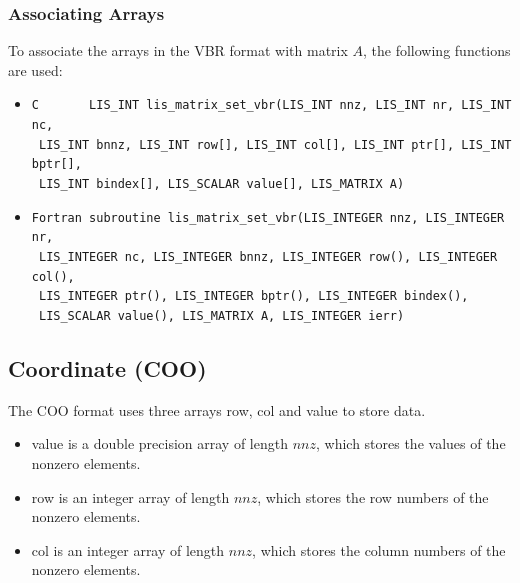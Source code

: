 \documentclass[a4paper]{article}
\begin{document}
\subsubsection{Associating Arrays}
To associate the arrays in the VBR format with matrix $A$, the following functions are used:
\begin{itemize}
\item \verb|C       LIS_INT lis_matrix_set_vbr(LIS_INT nnz, LIS_INT nr, LIS_INT nc,|\\
      \verb| LIS_INT bnnz, LIS_INT row[], LIS_INT col[], LIS_INT ptr[], LIS_INT bptr[],|\\
      \verb| LIS_INT bindex[], LIS_SCALAR value[], LIS_MATRIX A)|
\item \verb|Fortran subroutine lis_matrix_set_vbr(LIS_INTEGER nnz, LIS_INTEGER nr,|\\
      \verb| LIS_INTEGER nc, LIS_INTEGER bnnz, LIS_INTEGER row(), LIS_INTEGER col(),|\\
      \verb| LIS_INTEGER ptr(), LIS_INTEGER bptr(), LIS_INTEGER bindex(), |\\
      \verb| LIS_SCALAR value(), LIS_MATRIX A, LIS_INTEGER ierr)|
\end{itemize}

\newpage
\subsection{Coordinate (COO)}
The COO format uses three arrays {\ttfamily row}, {\ttfamily col} and {\ttfamily value} to store data.
\begin{itemize}
\item {\ttfamily value} is a double precision array of length
      $nnz$, which stores the values of the nonzero elements.
\item {\ttfamily row} is an integer array of length $nnz$, which stores the row numbers of the nonzero elements.
\item {\ttfamily col} is an integer array of length $nnz$, which stores the column numbers of the nonzero elements.
\end{itemize}
\end{document}
